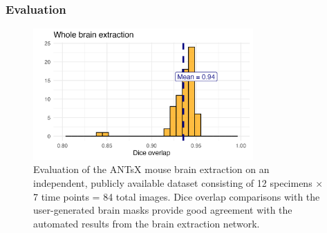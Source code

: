 \documentclass[
  12pt,
]{article}
\begin{document}
\subsubsection{Evaluation}\label{evaluation}

\begin{figure}
\centering
  \includegraphics[width=0.75\textwidth]{Figures/diceWholeBrain.png}
\caption{Evaluation of the ANTsX mouse brain extraction on an
independent, publicly available dataset consisting of 12 specimens $\times$ 7
time points = 84 total images.  Dice overlap comparisons with the
user-generated brain masks provide good agreement with the automated results
from the brain extraction network.}
\label{fig:evaluation}
\end{figure}
\end{document}
